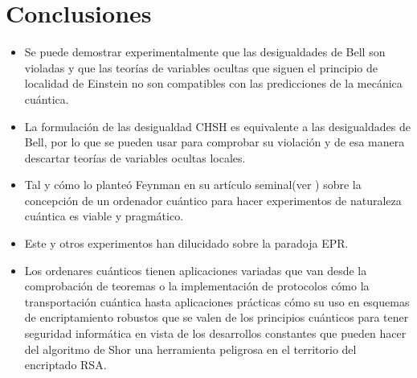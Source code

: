 \documentclass[a4paper]{article}
\begin{document}
\section{Conclusiones}
\begin{itemize}
\item Se puede demostrar experimentalmente que las desigualdades de Bell son violadas y que las teorías de variables ocultas que siguen el principio de localidad de Einstein no son compatibles con las predicciones de la mecánica cuántica.

\item La formulación de las desigualdad CHSH es equivalente a las desigualdades de Bell, por lo que se pueden usar para comprobar su violación y de esa manera descartar teorías de variables ocultas locales.

\item Tal y cómo lo planteó Feynman en su artículo seminal(ver \cite{Feynman}) sobre la concepción de un ordenador cuántico para hacer experimentos de naturaleza cuántica es viable y pragmático.

\item Este y otros experimentos han dilucidado sobre la paradoja EPR.

\item Los ordenares cuánticos tienen aplicaciones variadas que van desde la comprobación de teoremas o la implementación de protocolos cómo la transportación cuántica hasta aplicaciones prácticas cómo su uso en esquemas de encriptamiento robustos que se valen de los principios cuánticos para tener seguridad informática en vista de los desarrollos constantes que pueden hacer del algoritmo de Shor una herramienta peligrosa en el territorio del encriptado RSA.


\end{itemize}
\pagebreak
\end{document}
